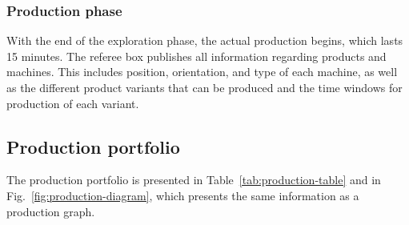 \documentclass[12pt,twoside]{article}
\newcommand{\mytable}[1]{\savebox{\myt}{#1}\tikz\node[fill=gray!25!white]{\usebox{\myt}};}
\begin{document}
\subsubsection{Production phase}
\label{sec:production-phase}

With the end of the exploration phase, the actual production begins,
which lasts \num{15} minutes. The referee box publishes all information
regarding products and machines. This includes position, orientation,
and type of each machine, as well as the different product variants
that can be produced and the time windows for production of each
variant. 


\subsection{Production portfolio}
\label{sec:prodportfolio}

The production portfolio is presented in
Table~\ref{tab:production-table} and in
Fig.~\ref{fig:production-diagram}, which presents the same information
as a production graph.







\end{document}
